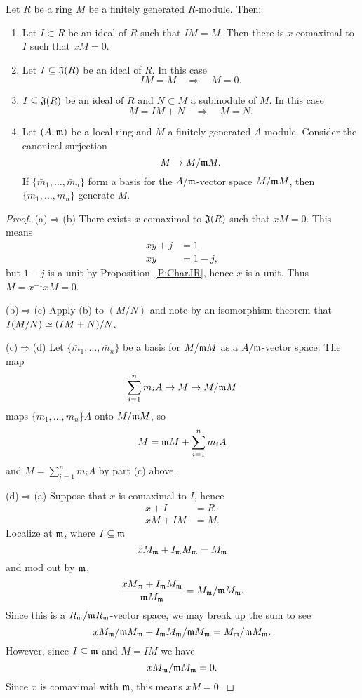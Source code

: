 \documentclass{ximera}
\begin{document}
\begin{theorem}
  Let $R$ be a ring $M$ be a finitely generated $R$-module. Then:
  \begin{enumerate}
    \item Let $I\subset R$ be an ideal of $R$ such that $IM = M$. Then
      there is $x$ comaximal to $I$ such that $xM = 0$.
    \item Let $I\subseteq \mathfrak J(R)$ be an ideal of $R$. In this case
      \[
      IM = M \quad\Rightarrow\quad M = 0.
      \]
    \item $I\subseteq \mathfrak J(R)$ be an ideal of $R$ and $N\subset M$ a
      submodule of $M$. In this case
      \[
      M = IM + N \quad \Rightarrow \quad M = N.
      \]
    \item Let $(A,\mathfrak{m})$ be a local ring and $M$ a finitely generated
      $A$-module. Consider the canonical surjection
      \[
      M \to  M/\mathfrak{m} M.
      \]
      If $\{\bar{m}_1,\dots, \bar{m}_n\}$ form a basis for the $A/\mathfrak{m}$-vector
      space $M/\mathfrak{m} M$, then $\{m_1,\dots, m_n\}$ generate $M$.
  \end{enumerate}
  \begin{proof} 
    (a)$\Rightarrow$(b) There exists $x$ comaximal to $\mathfrak J(R)$ such
    that $xM = 0$. This means
    \begin{align*}
      xy + j &= 1\\
      xy &= 1-j,
    \end{align*}
    but $1-j$ is a unit by Proposition~\ref{P:CharJR}, hence $x$ is a
    unit. Thus $M = x^{-1}x M = 0$.

    
    (b)$\Rightarrow$(c) Apply (b) to $(M/N)$ and note by an
    isomorphism theorem that $I(M/N)\simeq (IM + N)/N$.

    
    (c)$\Rightarrow$(d) Let $\{\bar{m}_1,\dots,\bar{m}_n\}$ be a basis
    for $M/\mathfrak{m} M$ as a $A/\mathfrak{m}$-vector space. The map
    \[
    \sum_{i=1}^n m_iA \to M \to M/\mathfrak{m} M
    \]
    maps $\{m_1,\dots, m_n\}A$ onto $M/\mathfrak{m} M$, so
    \[
    M = \mathfrak{m} M + \sum_{i=1}^n m_iA 
    \]
    and $M = \sum_{i=1}^n m_iA$ by part (c) above.

    
    (d)$\Rightarrow$(a) Suppose that $x$ is comaximal to $I$, hence
    \begin{align*}
      x + I &= R\\
      xM + IM &= M.
    \end{align*}
    Localize at $\mathfrak{m}$, where $I\subseteq\mathfrak{m}$
    \[
    xM_{\mathfrak{m}} + I_{\mathfrak{m}} M_{\mathfrak{m}} = M_{\mathfrak{m}}
    \]
    and mod out by $\mathfrak{m}$,
    \[
    \frac{xM_{\mathfrak{m}} + I_{\mathfrak{m}} M_{\mathfrak{m}}}{\mathfrak{m} M_{\mathfrak{m}}} = M_{\mathfrak{m}}/\mathfrak{m} M_{\mathfrak{m}}.
    \]
    Since this is a $R_{\mathfrak{m}}/\mathfrak{m} R_{\mathfrak{m}}$-vector space, we may break up the
    sum to see
    \[
    xM_{\mathfrak{m}}/\mathfrak{m} M_{\mathfrak{m}} + I_{\mathfrak{m}} M_{\mathfrak{m}}/\mathfrak{m} M_{\mathfrak{m}} = M_{\mathfrak{m}}/\mathfrak{m} M_{\mathfrak{m}}.
    \]
    However, since $I\subseteq\mathfrak{m}$ and $M = IM$ we have
    \[
    xM_{\mathfrak{m}}/\mathfrak{m} M_{\mathfrak{m}} =0.
    \]
    Since $x$ is comaximal with $\mathfrak{m}$, this means $xM = 0$.
  \end{proof}
\end{theorem}
\end{document}
